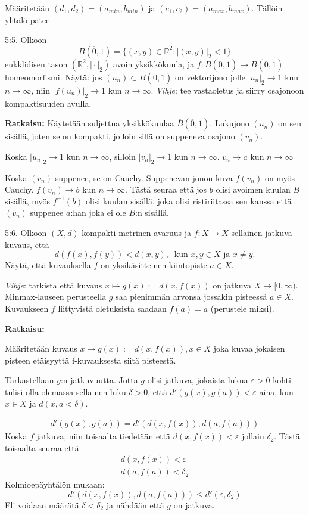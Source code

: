 \documentclass[12pt,a4paper,leqno]{amsart}
\begin{document}
Määritetään $(d_1, d_2) = (a_{min}, b_{min})$ ja $(c_1, c_2) = (a_{max}, b_{max})$. Tällöin yhtälö pätee.
\bigskip

5:5. Olkoon 
\[
B(\overline{0},1) = \{(x,y) \in \mathbb R^2: \vert (x,y)\vert_2 < 1\}
\]
eukklidisen tason $( \mathbb R^2, \vert \cdot \vert_2)$ avoin yksikkökuula, ja $f: B(\overline{0},1)  \to B(\overline{0},1)$ homeomorfismi. 
Näytä: jos $(u_n) \subset B(\overline{0},1)$  on vektorijono jolle 
$\vert u_n\vert_2 \to 1$
kun $n \to \infty$, niin $\vert f(u_n)\vert_2 \to 1$ kun $n \to \infty$.
 \textit{Vihje}: tee vastaoletus ja siirry osajonoon kompaktisuuden avulla.

\textbf{Ratkaisu:}
Käytetään suljettua yksikkökuulaa $\overline{B}(\overline{0}, 1)$. Lukujono $(u_n)$ on sen sisällä, joten se on kompakti, jolloin sillä on suppeneva osajono $(v_n)$.

Koska $\vert u_n\vert_2 \to 1$ kun $n \to \infty$, silloin $|v_n|_2 \to 1$ kun $n \to \infty$. $v_n \to a$ kun $n \to \infty$

Koska $(v_n)$ suppenee, se on Cauchy. Suppenevan jonon kuva $f(v_n)$  on myös Cauchy. $f(v_n) \to b$ kun $n \to \infty$. Tästä seuraa että jos $b$ olisi avoimen kuulan $B$ sisällä, myös $f^{-1}(b)$ olisi kuulan sisällä, joka olisi ristiriitassa sen kanssa että $(v_n)$ suppenee $a$:han joka ei ole $B$:n sisällä.

\bigskip

5:6. Olkoon $(X,d)$ kompakti metrinen avaruus ja $f: X \to X$ sellainen
jatkuva kuvaus, että 
\[
d(f(x),f(y)) < d(x,y),\  \textrm{ kun }  x, y \in X \textrm{ ja } x \neq y.
\]
Näytä, että kuvauksella $f$ on yksikäsitteinen kiintopiste $a \in X$.

\textit{Vihje}:  tarkista että kuvaus $x \mapsto g(x) := d(x,f(x))$ on jatkuva $X \to [0,\infty)$.
Minmax-lauseen perusteella $g$ saa  pienimmän arvonsa  jossakin pisteessä $a \in X$. 
Kuvaukseen $f$ liittyvistä oletuksista saadaan $f(a) = a$ (perustele miksi).

\textbf{Ratkaisu: }

Määritetään kuvaus $x \mapsto g(x) := d(x,f(x)), x \in X$ joka kuvaa jokaisen pisteen etäisyyttä f-kuvauksesta siitä pisteestä.

Tarkastellaan $g$:n jatkuvuutta. Jotta $g$ olisi jatkuva, jokaista lukua $\varepsilon > 0$ kohti tulisi olla olemassa sellainen luku $\delta > 0$, että $d'(g(x), g(a)) < \varepsilon$ aina, kun $x \in X $ ja $d(x, a < \delta)$.

\begin{align*}
    d'(g(x), g(a)) = d'(d(x, f(x)), d(a, f(a)))
\end{align*}
Koska $f$ jatkuva, niin toisaalta tiedetään että $d(x, f(x)) < \varepsilon$ jollain $\delta_2$. Tästä toisaalta seuraa että
\begin{align*}
    d(x, f(x)) < \varepsilon \\
    d(a, f(a)) < \delta_2
\end{align*}
Kolmioepäyhtälön mukaan:
\[d'(d(x, f(x)), d(a, f(a))) \leq d'(\varepsilon, \delta_2)\]
Eli voidaan määrätä $\delta < \delta_2$ ja nähdään että $g$ on jatkuva. 
\end{document}
